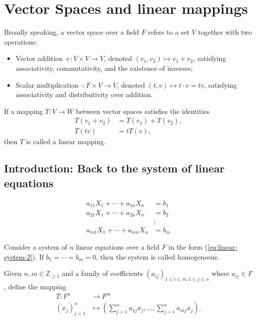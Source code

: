 \chapter{Vector Spaces and linear mappings}
\label{chap:VectorSpaces}

Broadly speaking, a vector space over a field $F$ refers to a set $V$ together with two operations:
\begin{itemize}
  \item Vector addition $+: V \times V \rightarrow V$, denoted $(v_1, v_2) \mapsto v_1 + v_2$, satisfying associativity, commutativity, and the existence of inverses;
  \item Scalar multiplication $\cdot: F \times V \rightarrow V$, denoted $(t, v) \mapsto t \cdot v = tv$, satisfying associativity and distributivity over addition.
\end{itemize}

If a mapping $T: V \rightarrow W$ between vector spaces satisfies the identities
\begin{align*}
  T(v_1 + v_2) &= T(v_1) + T(v_2),\\
  T(tv) &= tT(v),
\end{align*}
then $T$ is called a linear mapping.

\section{Introduction: Back to the system of linear equations}

\begin{align}
  a_{11}X_1 + \cdots + a_{1n}X_n &= b_1 \nonumber\\
  a_{21}X_1 + \cdots + a_{2n}X_n &= b_2 \nonumber \\
  &\vdots\nonumber \\
  a_{m1}X_1 + \cdots + a_{mn}X_n &= b_m \label{eq:linear-system-2}
\end{align}

\begin{definition}
  Consider a system of $n$ linear equations over a field $F$ in the form (\ref{eq:linear-system-2}). If $b_1 = \cdots = b_m = 0$, then the system is called homogeneous.
\end{definition}

Given $n,m \in \mathbb{Z}_{\geq 1}$ and a family of coefficients $(a_{ij})_{1 \leq i \leq m, 1 \leq j \leq n}$ where $a_{ij} \in F$, define the mapping
\begin{align*}
  T: F^n &\rightarrow F^m\\
  (x_j)_{j=1}^n &\mapsto \left(\sum_{j=1}^n a_{1j}x_j, \ldots, \sum_{j=1}^n a_{mj}x_j\right).
\end{align*}

